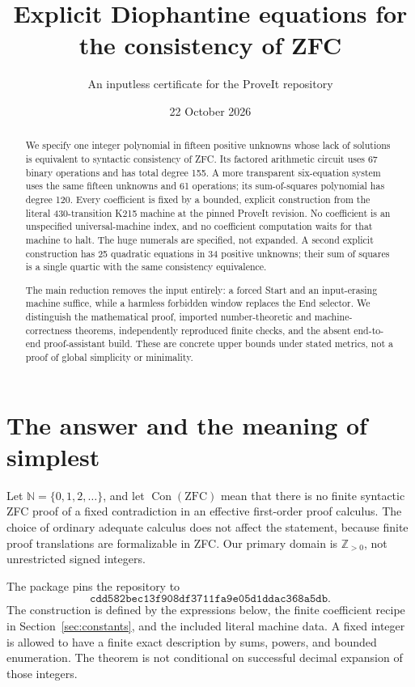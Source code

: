 \documentclass[11pt]{article}
\title{Explicit Diophantine equations for the consistency of ZFC}
\author{An inputless certificate for the ProveIt repository}
\date{22 October 2026}
\newcommand{\N}{\mathbb N}
\newcommand{\Pos}{\mathbb Z_{>0}}
\newcommand{\Con}{\operatorname{Con}}
\begin{document}
\maketitle
\begin{abstract}
We specify one integer polynomial in fifteen positive unknowns whose lack of solutions is equivalent to syntactic consistency of ZFC. Its factored arithmetic circuit uses 67 binary operations and has total degree 155. A more transparent six-equation system uses the same fifteen unknowns and 61 operations; its sum-of-squares polynomial has degree 120. Every coefficient is fixed by a bounded, explicit construction from the literal 430-transition K215 machine at the pinned ProveIt revision. No coefficient is an unspecified universal-machine index, and no coefficient computation waits for that machine to halt. The huge numerals are specified, not expanded. A second explicit construction has 25 quadratic equations in 34 positive unknowns; their sum of squares is a single quartic with the same consistency equivalence.

The main reduction removes the input entirely: a forced Start and an input-erasing machine suffice, while a harmless forbidden window replaces the End selector. We distinguish the mathematical proof, imported number-theoretic and machine-correctness theorems, independently reproduced finite checks, and the absent end-to-end proof-assistant build. These are concrete upper bounds under stated metrics, not a proof of global simplicity or minimality.
\end{abstract}

\section{The answer and the meaning of simplest}

Let \(\N=\{0,1,2,\ldots\}\), and let \(\Con(\mathrm{ZFC})\) mean that there is no finite syntactic ZFC proof of a fixed contradiction in an effective first-order proof calculus. The choice of ordinary adequate calculus does not affect the statement, because finite proof translations are formalizable in ZFC. Our primary domain is \(\Pos\), not unrestricted signed integers.

The package pins the repository to
\[
\texttt{cdd582bec13f908df3711fa9e05d1ddac368a5db}.
\]
The construction is defined by the expressions below, the finite coefficient recipe in Section~\ref{sec:constants}, and the included literal machine data. A fixed integer is allowed to have a finite exact description by sums, powers, and bounded enumeration. The theorem is not conditional on successful decimal expansion of those integers.
\end{document}

